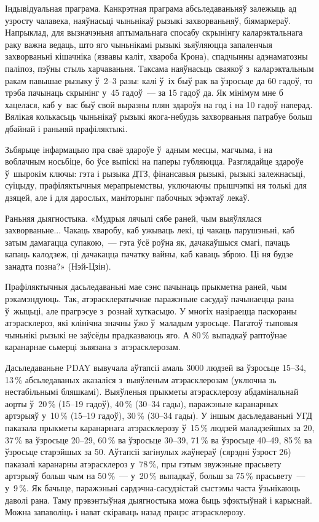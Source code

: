Індывідуальная праграма. Канкрэтная праграма абсьледаваньняў залежыць ад узросту чалавека, наяўнасьці чыньнікаў рызыкі захворваньняў, біямаркераў. Напрыклад, для вызначэньня аптымальнага спосабу скрынінгу каларэктальнага раку важна ведаць, што яго чыньнікамі рызыкі зьяўляюцца запаленчыя захворваньні кішачніка (язвавы каліт, хвароба Крона), спадчынны адэнаматозны паліпоз, пэўны стыль харчаваньня. Таксама наяўнасьць сваякоў з~каларэктальным ракам павышае рызыку ў~2--3 разы: калі ў~іх быў рак ва ўзросьце да 60 гадоў, то трэба пачынаць скрынінг у~45 гадоў~--- за 15 гадоў да. Як мінімум мне б хацелася, каб у~вас быў свой выразны плян здароўя на год і на 10 гадоў наперад. Вялікая колькасьць чыньнікаў рызыкі якога-небудзь захворваньня патрабуе больш дбайнай і раньняй прафіляктыкі.

Зьбярыце інфармацыю пра сваё здароўе ў~адным месцы, магчыма, і на воблачным носьбіце, бо ўсе выпіскі на паперы губляюцца. Разглядайце здароўе ў~шырокім ключы: гэта і рызыка ДТЗ, фінансавыя рызыкі, рызыкі залежнасьці, суіцыду, прафіляктычныя мерапрыемствы, уключаючы прышчэпкі ня толькі для дзяцей, але і для дарослых, маніторынг пабочных эфэктаў лекаў.

Раньняя дыягностыка. «Мудрыя лячылі сябе раней, чым выяўлялася захворваньне... Чакаць хваробу, каб ужываць лекі, ці чакаць парушэньні, каб затым дамагацца супакою,~--- гэта ўсё роўна як, дачакаўшыся смагі, пачаць капаць калодзеж, ці дачакацца пачатку вайны, каб каваць зброю. Ці ня будзе занадта позна?» (Нэй-Цзін).

Прафіляктычныя дасьледаваньні мае сэнс пачынаць прыкметна раней, чым рэкамэндуюць. Так, атэрасклератычнае паражэньне сасудаў пачынаецца рана ў~жыцьці, але прагрэсуе з~рознай хуткасьцю. У многіх назіраецца паскораны атэрасклероз, які клінічна значны ўжо ў~маладым узросьце. Пагатоў тыповыя чыньнікі рызыкі не заўсёды прадказваюць яго. А 80\,\% выпадкаў раптоўнае каранарнае сьмерці зьвязана з~атэрасклерозам.

Дасьледаваньне PDAY вывучала аўтапсіі амаль 3000 людзей ва ўзросьце 15--34, 13\,\% абсьледаваных аказаліся з~выяўленым атэрасклерозам (уключна зь нестабільнымі бляшкамі). Выяўленыя прыкметы атэрасклерозу абдамінальнай аорты ў~20\,\% (15--19 гадоў), 40\,\% (30--34 гады), паражэньне каранарных артэрыяў у~10\,\% (15--19 гадоў), 30\,\% (30--34 гады). У іншым дасьледаваньні УГД паказала прыкметы каранарнага атэрасклерозу ў~15\,\% людзей маладзейшых за 20, 37\,\% ва ўзросьце 20--29, 60\,\% ва ўзросьце 30--39, 71\,\% ва ўзросьце 40--49, 85\,\% ва ўзросьце старэйшых за 50. Аўтапсіі загінулых жаўнераў (сярэдні ўзрост 26) паказалі каранарны атэрасклероз у~78\,\%, пры гэтым звужэньне прасьвету артэрыяў больш чым на 50\,\%~--- у~20\,\% выпадкаў, больш за 75\,\% прасьвету~--- у~9\,\%. Як бачыце, паражэньні сардэчна-сасудзістай сыстэмы часта ўзьнікаюць даволі рана. Таму прэвэнтыўная дыягностыка можа быць эфэктыўнай і карыснай. Можна запаволіць і нават скіраваць назад працэс атэрасклерозу.

